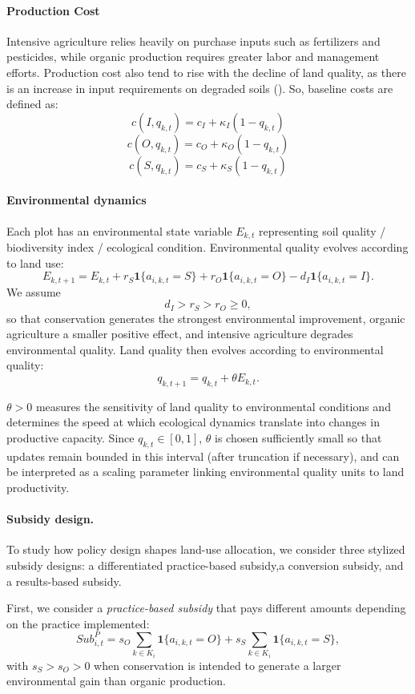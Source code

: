 \documentclass{article}
\begin{document}
\paragraph{Production Cost}
Intensive agriculture relies heavily on purchase inputs such as fertilizers and pesticides, while organic production requires greater labor and management efforts. Production cost also tend to rise with the decline of land quality, as there is an increase in input requirements on degraded soils (\cite{usda2010impact, durham2021economics}). So, baseline costs are defined as:
\[
c(I, q_{k,t}) = c_I + \kappa_I(1-q_{k,t})
\]
\[
c(O, q_{k,t}) = c_O + \kappa_O(1-q_{k,t})
\]
\[
c(S, q_{k,t}) = c_S + \kappa_S(1-q_{k,t})
\]

\paragraph{Environmental dynamics}
Each plot has an environmental state variable $E_{k,t}$ representing soil quality / biodiversity index / ecological condition. Environmental quality evolves according to land use:
\[
E_{k,t+1} = E_{k,t} + r_S \mathbf{1}\{a_{i,k,t}=S\} + r_O \mathbf{1}\{a_{i,k,t}=O\} - d_I \mathbf{1}\{a_{i,k,t}=I\}.
\]
We assume
\[
d_I > r_S > r_O \geq 0,
\]
so that conservation generates the strongest environmental improvement, organic agriculture a smaller positive effect, and intensive agriculture degrades environmental quality. Land quality then evolves according to environmental quality:
\[
q_{k,t+1} = q_{k,t} + \theta E_{k,t}.
\]

$\theta > 0$ measures the sensitivity of land quality to environmental conditions and determines the speed at which ecological dynamics translate into changes in productive capacity. Since $q_{k,t} \in [0,1]$, $\theta$ is chosen sufficiently small so that updates remain bounded in this interval (after truncation if necessary), and can be interpreted as a scaling parameter linking environmental quality units to land productivity.

\paragraph{Subsidy design.}
To study how policy design shapes land-use allocation, we consider three stylized subsidy designs: a differentiated practice-based subsidy,a conversion subsidy, and a results-based subsidy.

First, we consider a \emph{practice-based subsidy} that pays different amounts depending on the practice implemented:
\[
Sub^{P}_{i,t} = s_O \sum_{k \in K_i} \mathbf{1}\{a_{i,k,t}=O\} + s_S \sum_{k \in K_i} \mathbf{1}\{a_{i,k,t}=S\},
\]
with $s_S > s_O > 0$ when conservation is intended to generate a larger environmental gain than organic production.
\end{document}
